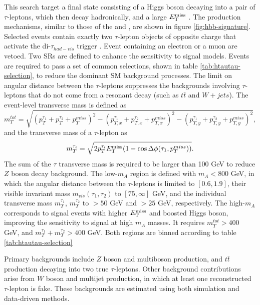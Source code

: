 This search target a final state consisting of a Higgs boson decaying into a pair of $\tau$-leptons, which then decay hadronically, and a large $E_{\mathrm{T}}^{\mathrm{miss}}$ \cite{HDBS-2018-50}. The production mechanisms, similar to those of the \monohbb and \monohgamgam, are shown in figure \ref{fig:hbb-signature}. Selected events contain exactly two $\tau$-lepton objects of opposite charge that activate the di-$\tau_{had-vis}$ trigger \cite{ATLAS-CONF-2017-061}. Event containing an electron or a muon are vetoed. Two SRs are defined to enhance the sensitivity to \thdma signal models. Events are required to pass a set of common selections, shown in table \ref{tab:htautau-selection}, to reduce the dominant SM background processes. The limit on angular distance between the $\tau$-leptons suppresses the backgrounds involving $\tau$-leptons that do not come from a resonant decay (such as $t\bar{t}$ and $W+jets$). The event-level transverse mass is defined as 
\begin{equation}
    \label{4.11}
    m_T^{tot} = \sqrt{(p_T^{\tau_1} + p_T^{\tau_2} + p_T^{miss})^2 - (p_{T,x}^{\tau_1} + p_{T,x}^{\tau_2} + p_{T,x}^{miss})^2 - (p_{T,y}^{\tau_1} + p_{T,y}^{\tau_2} + p_{T,y}^{miss})^2},
\end{equation}
and the transverse mass of a $\tau$-lepton as
\begin{equation}
    \label{4.12}
    m_T^{\tau_i} = \sqrt{2p_T^{\tau_i}E_{\mathrm{T}}^{\mathrm{miss}}(1-\cos\Delta\phi(\tau_1, p_T^{miss}))}.
\end{equation}
The sum of the $\tau$ transverse mass is required to be larger than 100 GeV to reduce $Z$ boson decay background. The low-$m_A$ region is defined with $m_A<800$ GeV, in which the angular distance between the $\tau$-leptons is limited to $[0.6,1.9]$, their visible invariant mass $m_{vis}(\tau_1,\tau_2)$ to $[75, \infty]$ GeV, and the individual transverse mass $m_T^{\tau_1}$, $m_T^{\tau_2}$ to $>50$ GeV and $>25$ GeV, respectively. The high-$m_A$ corresponds to signal events with higher $E_{\mathrm{T}}^{\mathrm{miss}}$ and boosted Higgs boson, improving the sensitivity to \thdma signal at high $m_A$ masses. It requires $m_T^{tot}>400$ GeV, and $m_T^{\tau_1} + m_T^{\tau_2}>400$ GeV. Both regions are binned according to table \ref{tab:htautau-selection}

Primary backgrounds include $Z$ boson and multiboson production, and $t\bar{t}$ production decaying into two true $\tau$-leptons. Other background contributions arise from $W$ boson and multijet production, in which at least one reconstructed $\tau$-lepton is fake. These backgrounds are estimated using both simulation and data-driven methods. 
 
